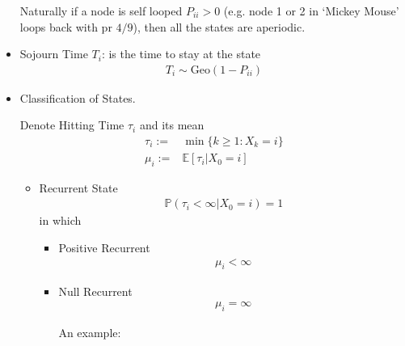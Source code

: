 \begin{itemize}[topsep=2pt,itemsep=0pt]
        Naturally if a node is self looped $ P_{ii}>0 $ (e.g. node 1 or 2 in `Mickey Mouse' loops back with pr $ 4/9 $), then all the states are aperiodic.
        \item Sojourn Time $ T_i $: is the time to stay at the state
        \begin{align*}
            T_i\sim \mathrm{Geo}(1-P_{ii})  
        \end{align*}
        \item Classification of States. 
        
        Denote Hitting Time $ \tau_i $ and its mean 
        \begin{align*}
            \tau_i:=&\min\{k\geq 1:X_k=i\}\\
            \mu _i:=&\mathbb{E}\left[ \tau_i|X_0=i \right] 
        \end{align*}
        
        \begin{itemize}[topsep=2pt,itemsep=0pt]
            \item Recurrent State
            \begin{align*}
                \mathbb{P}\left( \tau_i<\infty|X_0=i    \right)=1  
            \end{align*}
            in which 
            \begin{itemize}[topsep=2pt,itemsep=0pt]
                \item Positive Recurrent
                \begin{align*}
                    \mu _i<\infty 
                \end{align*}
                \item Null Recurrent
                \begin{align*}
                    \mu _i=\infty 
                \end{align*}

                An example:
                \begin{center}
\end{center}
\end{itemize}
\end{itemize}
\end{itemize}
